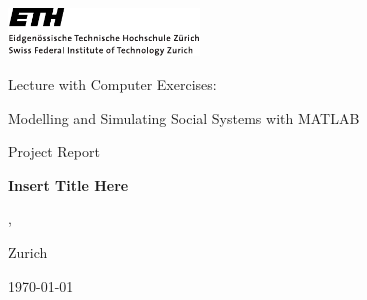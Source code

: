 \includegraphics[width=2in]{ETHlogo.pdf}


\begin{center}
    

\LARGE
Lecture with Computer Exercises:

Modelling and Simulating Social Systems with MATLAB



\normalsize Project Report


\textbf{\huge{Insert Title Here}}


\Large{ \nameA, \nameB}


\large{
Zurich

\today}

\normalsize

\end{center}
\thispagestyle{empty}

\newpage